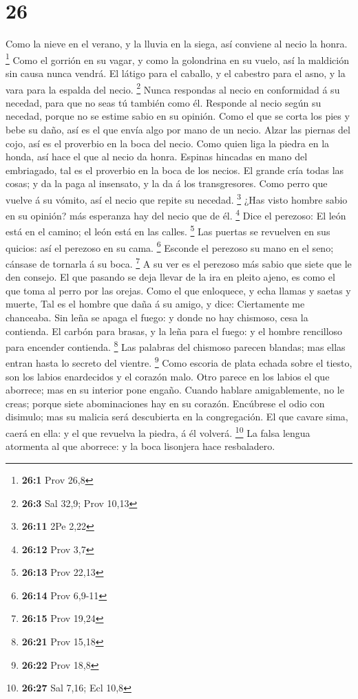 \hypertarget{section-25}{%
\section{26}\label{section-25}}

 Como la nieve en el verano, y la lluvia en la siega, así
conviene al necio la honra. \footnote{\textbf{26:1} Prov 26,8}
 Como el gorrión en su vagar, y como la golondrina en su
vuelo, así la maldición sin causa nunca vendrá.  El látigo
para el caballo, y el cabestro para el asno, y la vara para la espalda
del necio. \footnote{\textbf{26:3} Sal 32,9; Prov 10,13} 
Nunca respondas al necio en conformidad á su necedad, para que no seas
tú también como él.  Responde al necio según su necedad,
porque no se estime sabio en su opinión.  Como el que se
corta los pies y bebe su daño, así es el que envía algo por mano de un
necio.  Alzar las piernas del cojo, así es el proverbio en
la boca del necio.  Como quien liga la piedra en la honda,
así hace el que al necio da honra.  Espinas hincadas en mano
del embriagado, tal es el proverbio en la boca de los necios.
 El grande cría todas las cosas; y da la paga al insensato,
y la da á los transgresores.  Como perro que vuelve á su
vómito, así el necio que repite su necedad. \footnote{\textbf{26:11} 2Pe
  2,22}  ¿Has visto hombre sabio en su opinión? más
esperanza hay del necio que de él. \footnote{\textbf{26:12} Prov 3,7}
 Dice el perezoso: El león está en el camino; el león está
en las calles. \footnote{\textbf{26:13} Prov 22,13}  Las
puertas se revuelven en sus quicios: así el perezoso en su cama.
\footnote{\textbf{26:14} Prov 6,9-11}  Esconde el perezoso
su mano en el seno; cánsase de tornarla á su boca. \footnote{\textbf{26:15}
  Prov 19,24}  A su ver es el perezoso más sabio que siete
que le den consejo.  El que pasando se deja llevar de la
ira en pleito ajeno, es como el que toma al perro por las orejas.
 Como el que enloquece, y echa llamas y saetas y muerte,
 Tal es el hombre que daña á su amigo, y dice: Ciertamente
me chanceaba.  Sin leña se apaga el fuego: y donde no hay
chismoso, cesa la contienda.  El carbón para brasas, y la
leña para el fuego: y el hombre rencilloso para encender contienda.
\footnote{\textbf{26:21} Prov 15,18}  Las palabras del
chismoso parecen blandas; mas ellas entran hasta lo secreto del vientre.
\footnote{\textbf{26:22} Prov 18,8}  Como escoria de plata
echada sobre el tiesto, son los labios enardecidos y el corazón malo.
 Otro parece en los labios el que aborrece; mas en su
interior pone engaño.  Cuando hablare amigablemente, no le
creas; porque siete abominaciones hay en su corazón. 
Encúbrese el odio con disimulo; mas su malicia será descubierta en la
congregación.  El que cavare sima, caerá en ella: y el que
revuelva la piedra, á él volverá. \footnote{\textbf{26:27} Sal 7,16; Ecl
  10,8}  La falsa lengua atormenta al que aborrece: y la
boca lisonjera hace resbaladero.

